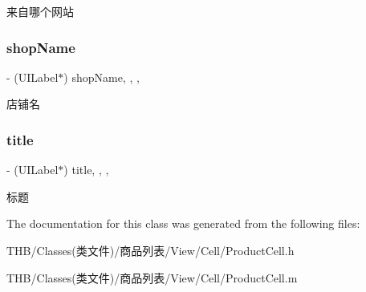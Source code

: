 来自哪个网站 \mbox{\label{interface_product_cell_a829f21fdd1d59758ae2285c13f5f0f9c}} 
\subsubsection{\texorpdfstring{shop\+Name}{shopName}}
{\footnotesize\ttfamily -\/ (U\+I\+Label$\ast$) shop\+Name\hspace{0.3cm}{\ttfamily [read]}, {\ttfamily [write]}, {\ttfamily [nonatomic]}, {\ttfamily [strong]}}

店铺名 \mbox{\label{interface_product_cell_aaff5a1ff89e3c40caf0c2fc336a2fa9a}} 
\subsubsection{\texorpdfstring{title}{title}}
{\footnotesize\ttfamily -\/ (U\+I\+Label$\ast$) title\hspace{0.3cm}{\ttfamily [read]}, {\ttfamily [write]}, {\ttfamily [nonatomic]}, {\ttfamily [strong]}}

标题 

The documentation for this class was generated from the following files\+:\begin{DoxyCompactItemize}
\item 
T\+H\+B/\+Classes(类文件)/商品列表/\+View/\+Cell/Product\+Cell.\+h\item 
T\+H\+B/\+Classes(类文件)/商品列表/\+View/\+Cell/Product\+Cell.\+m\end{DoxyCompactItemize}
